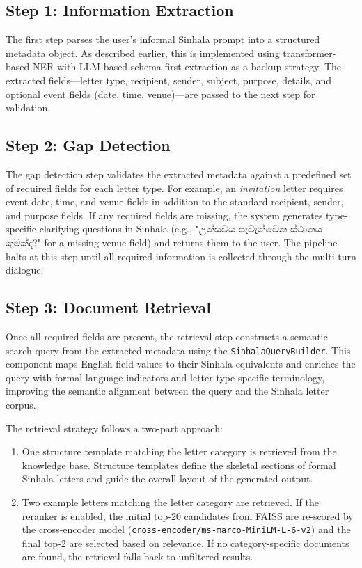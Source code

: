 \documentclass[12pt]{uomthesis}
\begin{document}
\subsection{Step 1: Information Extraction}

The first step parses the user's informal Sinhala prompt into a structured metadata object. As described earlier, this is implemented using transformer-based NER with LLM-based schema-first extraction as a backup strategy. The extracted fields—letter type, recipient, sender, subject, purpose, details, and optional event fields (date, time, venue)—are passed to the next step for validation.

\subsection{Step 2: Gap Detection}

The gap detection step validates the extracted metadata against a predefined set of required fields for each letter type. For example, an \textit{invitation} letter requires event date, time, and venue fields in addition to the standard recipient, sender, and purpose fields. If any required fields are missing, the system generates type-specific clarifying questions in Sinhala (e.g., "උත්සවය පැවැත්වෙන ස්ථානය කුමක්ද?" for a missing venue field) and returns them to the user. The pipeline halts at this step until all required information is collected through the multi-turn dialogue.

\subsection{Step 3: Document Retrieval}

Once all required fields are present, the retrieval step constructs a semantic search query from the extracted metadata using the \texttt{SinhalaQueryBuilder}. This component maps English field values to their Sinhala equivalents and enriches the query with formal language indicators and letter-type-specific terminology, improving the semantic alignment between the query and the Sinhala letter corpus.

The retrieval strategy follows a two-part approach:
\begin{enumerate}
    \item One structure template matching the letter category is retrieved from the knowledge base. Structure templates define the skeletal sections of formal Sinhala letters and guide the overall layout of the generated output.
    \item Two example letters matching the letter category are retrieved. If the reranker is enabled, the initial top-20 candidates from FAISS are re-scored by the cross-encoder model (\texttt{cross-encoder/ms-marco-MiniLM-L-6-v2}) and the final top-2 are selected based on relevance. If no category-specific documents are found, the retrieval falls back to unfiltered results.
\end{enumerate}
\end{document}
